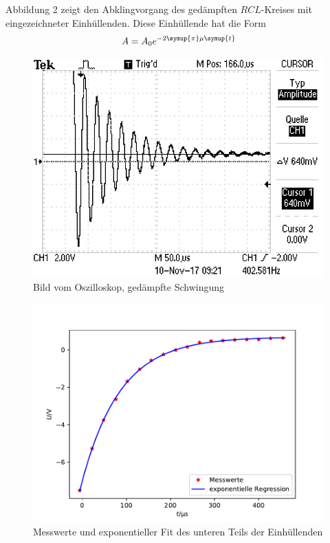 Abbildung 2 zeigt den Abklingvorgang des gedämpften $RCL$-Kreises mit eingezeichneter
Einhüllenden. Diese Einhüllende hat die Form
\begin{equation}
  A = A_0e^{-2\symup{\pi}\mu\symup{t}}
\end{equation}

\begin{figure}[h]
  \centering
  \includegraphics[scale=0.8]{Schwingung.JPG}
  \caption{Bild vom Oszilloskop, gedämpfte Schwingung}
  \label{Bild}
\end{figure}

\begin{figure}
   \centering
   \includegraphics[scale = 0.5]{plotA1.pdf}
   \caption{Messwerte und exponentieller Fit des  unteren Teils der Einhüllenden}
   \label{Abb:2}
 \end{figure}

